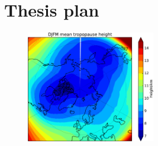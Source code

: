 \section{Thesis plan}

\begin{figure}
 \centering
 \noindent\includegraphics[width=0.5\textwidth]{figures/chapter-intro/mean_tropopause_height.pdf}
 \caption[]{ }
 \label{fig:cmip5_mslp_diff}
\end{figure}



